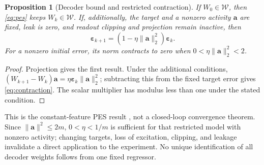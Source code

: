 \documentclass[letterpaper, 10 pt, conference]{ieeeconf}
\newtheorem{proposition}{Proposition}
\newtheorem{remark}{Remark}
\begin{document}
\begin{proposition}[Decoder bound and restricted contraction]
\label{prop:pes}
If $W_0\in\mathcal W$, then \eqref{eq:pes} keeps $W_k\in\mathcal W$.
If, additionally, the target and a nonzero activity $\bm a$ are fixed,
leak is zero, and readout clipping and projection remain inactive, then
\begin{equation}
 \bm\varepsilon_{k+1}
       =(1-\eta\|\bm a\|_2^2)\bm\varepsilon_k.
 \label{eq:contraction}
\end{equation}
For a nonzero initial error, its norm contracts to zero when
$0<\eta\|\bm a\|_2^2<2$.
\end{proposition}
\begin{proof}
Projection gives the first result. Under the additional conditions,
$(W_{k+1}-W_k)\bm a=\eta\bm\varepsilon_k\|\bm a\|_2^2$;
subtracting this from the fixed target error gives
\eqref{eq:contraction}. The scalar multiplier has modulus less than one
under the stated condition.
\end{proof}
This is the constant-feature PES result \cite{voelker2015pes}, not a
closed-loop convergence theorem. Since $\|\bm a\|^2\le2m$,
$0<\eta<1/m$ is sufficient for that restricted model with nonzero
activity; changing targets, loss of excitation, clipping, and leakage
invalidate a direct application to the experiment. No unique identification
of all decoder weights follows from one fixed regressor.

\end{document}
